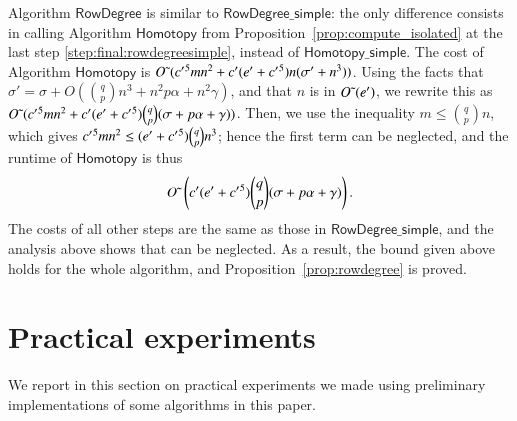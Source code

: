 \documentclass[amsthm]{elsart}
\begin{document}
Algorithm $\mathsf{RowDegree}$ is similar to
$\mathsf{RowDegree\_simple}$: the only difference consists in calling
Algorithm $\mathsf{Homotopy}$ from
Proposition~\ref{prop:compute_isolated} at the last step
\eqref{step:final:rowdegreesimple}, instead of
$\mathsf{Homotopy\_simple}$. The cost of Algorithm
$\mathsf{Homotopy}$ is ${O}{\,\tilde{ }\,}({c'}{}^5 m n^2 + {c'}{}({e'}{}+{c'}{}^5) n(\sigma'
+ n^3))$.  Using the facts that $\sigma'= \sigma +O( {q \choose p} n^3
+ n^2 p \alpha+ n^2\gamma)$, and that $n$ is in ${O}{\,\tilde{ }\,}({e'}{})$, we
rewrite this as ${O}{\,\tilde{ }\,}({c'}{}^5 m n^2 + {c'}{}({e'}{}+{c'}{}^5 ) {q \choose
  p}(\sigma + p \alpha+ \gamma))$.  Then, we use the inequality $m \le
{q \choose p} n$, which gives ${c'}{}^5 m n^2 \le ({e'}{}+{c'}{}^5) {q \choose
  p} n^3$; hence the first term can be neglected, and the runtime of
$\mathsf{Homotopy}$ is thus
\[
{O}{\,\tilde{ }\,}\left( {c'}{}({e'}{}+{c'}{}^5 ) {q \choose p}(\sigma  +  p \alpha+ \gamma)\right).
\]
The costs of all other steps are the same as those in
$\mathsf{RowDegree\_simple}$, and the analysis above shows that can be
neglected. As a result, the bound given above holds for the whole
algorithm, and Proposition~\ref{prop:rowdegree} is proved.

\section{Practical experiments}\label{sec:experiments}

We report in this section on practical experiments we made using preliminary
implementations of some algorithms in this paper.
\end{document}
